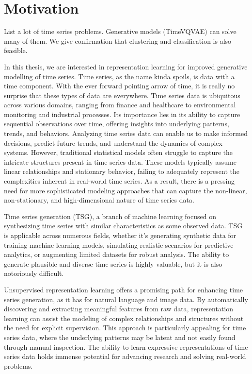 \documentclass[../../thesis.tex]{subfiles}
\begin{document}
\section{Motivation}

List a lot of time series problems. Generative models (TimeVQVAE) can solve many of them. We give confirmation that clustering and classification is also feasible. 


In this thesis, we are interested in representation learning for improved generative modelling of time series. Time series, as the name kinda spoils, is data with a time component. With the ever forward pointing arrow of time, it is really no surprise that these types of data are everywhere. Time series data is ubiquitous across various domains, ranging from finance and healthcare to environmental monitoring and industrial processes. Its importance lies in its ability to capture sequential observations over time, offering insights into underlying patterns, trends, and behaviors. Analyzing time series data can enable us to make informed decisions, predict future trends, and understand the dynamics of complex systems. However, traditional statistical models often struggle to capture the intricate structures present in time series data. These models typically assume linear relationships and stationary behavior, failing to adequately represent the complexities inherent in real-world time series. As a result, there is a pressing need for more sophisticated modeling approaches that can capture the non-linear, non-stationary, and high-dimensional nature of time series data.\newline

Time series generation (TSG), a branch of machine learning focused on synthesizing time series with similar characteristics as some observed data. TSG is applicable across numerous fields, whether it's generating synthetic data for training machine learning models, simulating realistic scenarios for predictive analytics, or augmenting limited datasets for robust analysis. The ability to generate plausible and diverse time series is highly valuable, but it is also notoriously difficult.\newline

Unsupervised representation learning offers a promising path for enhancing time series generation, as it has for natural language and image data. By automatically discovering and extracting meaningful features from raw data, representation learning can assist the modeling of complex relationships and structures without the need for explicit supervision. This approach is particularly appealing for time series data, where the underlying patterns may be latent and not easily found through manual inspection. The ability to learn expressive representations of time series data holds immense potential for advancing research and solving real-world problems.
\end{document}
